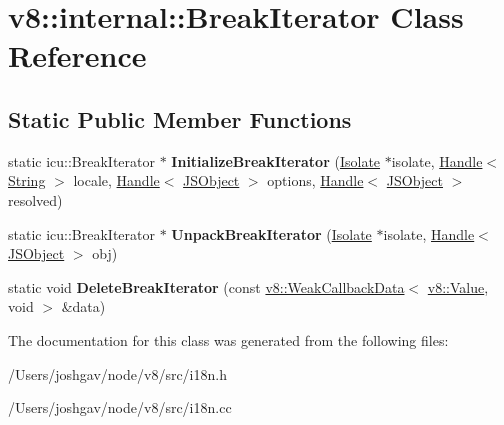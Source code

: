 \hypertarget{classv8_1_1internal_1_1_break_iterator}{}\section{v8\+:\+:internal\+:\+:Break\+Iterator Class Reference}
\label{classv8_1_1internal_1_1_break_iterator}
\subsection*{Static Public Member Functions}
\begin{DoxyCompactItemize}
\item 
static icu\+::\+Break\+Iterator $\ast$ {\bfseries Initialize\+Break\+Iterator} (\hyperlink{classv8_1_1internal_1_1_isolate}{Isolate} $\ast$isolate, \hyperlink{classv8_1_1internal_1_1_handle}{Handle}$<$ \hyperlink{classv8_1_1internal_1_1_string}{String} $>$ locale, \hyperlink{classv8_1_1internal_1_1_handle}{Handle}$<$ \hyperlink{classv8_1_1internal_1_1_j_s_object}{J\+S\+Object} $>$ options, \hyperlink{classv8_1_1internal_1_1_handle}{Handle}$<$ \hyperlink{classv8_1_1internal_1_1_j_s_object}{J\+S\+Object} $>$ resolved)\hypertarget{classv8_1_1internal_1_1_break_iterator_a1d623cf9da436f7d6d10e5c3e723618d}{}\label{classv8_1_1internal_1_1_break_iterator_a1d623cf9da436f7d6d10e5c3e723618d}

\item 
static icu\+::\+Break\+Iterator $\ast$ {\bfseries Unpack\+Break\+Iterator} (\hyperlink{classv8_1_1internal_1_1_isolate}{Isolate} $\ast$isolate, \hyperlink{classv8_1_1internal_1_1_handle}{Handle}$<$ \hyperlink{classv8_1_1internal_1_1_j_s_object}{J\+S\+Object} $>$ obj)\hypertarget{classv8_1_1internal_1_1_break_iterator_a1d4d6ca04ef88722131f56b727967eea}{}\label{classv8_1_1internal_1_1_break_iterator_a1d4d6ca04ef88722131f56b727967eea}

\item 
static void {\bfseries Delete\+Break\+Iterator} (const \hyperlink{classv8_1_1_weak_callback_data}{v8\+::\+Weak\+Callback\+Data}$<$ \hyperlink{classv8_1_1_value}{v8\+::\+Value}, void $>$ \&data)\hypertarget{classv8_1_1internal_1_1_break_iterator_aed441e8a20ba6d650d05dbe1710308fa}{}\label{classv8_1_1internal_1_1_break_iterator_aed441e8a20ba6d650d05dbe1710308fa}

\end{DoxyCompactItemize}


The documentation for this class was generated from the following files\+:\begin{DoxyCompactItemize}
\item 
/\+Users/joshgav/node/v8/src/i18n.\+h\item 
/\+Users/joshgav/node/v8/src/i18n.\+cc\end{DoxyCompactItemize}
